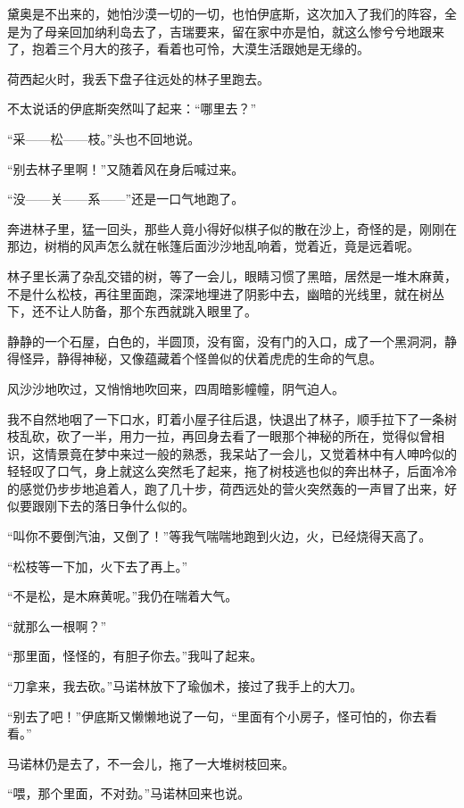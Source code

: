 \par 黛奥是不出来的，她怕沙漠一切的一切，也怕伊底斯，这次加入了我们的阵容，全是为了母亲回加纳利岛去了，吉瑞要来，留在家中亦是怕，就这么惨兮兮地跟来了，抱着三个月大的孩子，看着也可怜，大漠生活跟她是无缘的。
\par 荷西起火时，我丢下盘子往远处的林子里跑去。
\par 不太说话的伊底斯突然叫了起来：“哪里去？”
\par “采——松——枝。”头也不回地说。
\par “别去林子里啊！”又随着风在身后喊过来。
\par “没——关——系——”还是一口气地跑了。
\par 奔进林子里，猛一回头，那些人竟小得好似棋子似的散在沙上，奇怪的是，刚刚在那边，树梢的风声怎么就在帐篷后面沙沙地乱响着，觉着近，竟是远着呢。
\par 林子里长满了杂乱交错的树，等了一会儿，眼睛习惯了黑暗，居然是一堆木麻黄，不是什么松枝，再往里面跑，深深地埋进了阴影中去，幽暗的光线里，就在树丛下，还不让人防备，那个东西就跳入眼里了。
\par 静静的一个石屋，白色的，半圆顶，没有窗，没有门的入口，成了一个黑洞洞，静得怪异，静得神秘，又像蕴藏着个怪兽似的伏着虎虎的生命的气息。
\par 风沙沙地吹过，又悄悄地吹回来，四周暗影幢幢，阴气迫人。
\par 我不自然地咽了一下口水，盯着小屋子往后退，快退出了林子，顺手拉下了一条树枝乱砍，砍了一半，用力一拉，再回身去看了一眼那个神秘的所在，觉得似曾相识，这情景竟在梦中来过一般的熟悉，我呆站了一会儿，又觉着林中有人呻吟似的轻轻叹了口气，身上就这么突然毛了起来，拖了树枝逃也似的奔出林子，后面冷冷的感觉仍步步地追着人，跑了几十步，荷西远处的营火突然轰的一声冒了出来，好似要跟刚下去的落日争什么似的。
\par “叫你不要倒汽油，又倒了！”等我气喘喘地跑到火边，火，已经烧得天高了。
\par “松枝等一下加，火下去了再上。”
\par “不是松，是木麻黄呢。”我仍在喘着大气。
\par “就那么一根啊？”
\par “那里面，怪怪的，有胆子你去。”我叫了起来。
\par “刀拿来，我去砍。”马诺林放下了瑜伽术，接过了我手上的大刀。
\par “别去了吧！”伊底斯又懒懒地说了一句，“里面有个小房子，怪可怕的，你去看看。”
\par 马诺林仍是去了，不一会儿，拖了一大堆树枝回来。
\par “喂，那个里面，不对劲。”马诺林回来也说。
